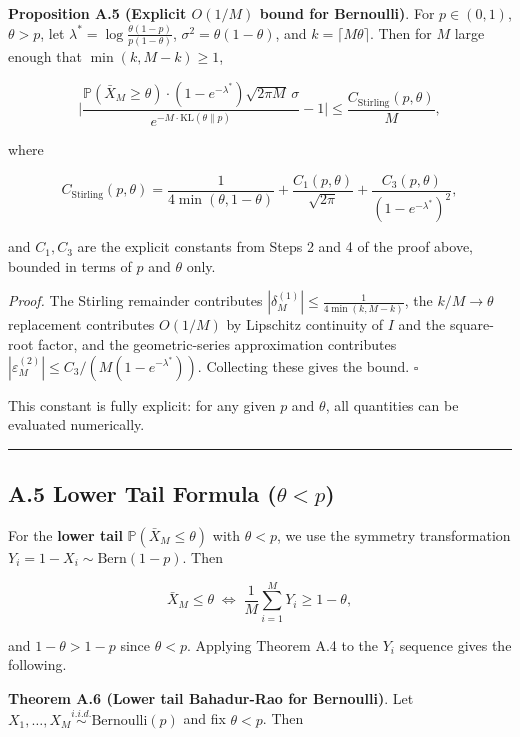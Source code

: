 \documentclass[
  12pt,
]{article}
\begin{document}
\textbf{Proposition A.5 (Explicit \(O(1/M)\) bound for Bernoulli)}. For
\(p \in (0,1)\), \(\theta > p\), let
\(\lambda^* = \log\frac{\theta(1-p)}{p(1-\theta)}\),
\(\sigma^2 = \theta(1-\theta)\), and \(k = \lceil M\theta\rceil\). Then
for \(M\) large enough that \(\min(k, M-k) \geq 1\),

\[
\Bigg|
\frac{\mathbb{P}(\bar{X}_M \geq \theta) \cdot (1-e^{-\lambda^*}) \sqrt{2\pi M}\, \sigma}
{e^{-M\cdot\text{KL}(\theta\|p)}} - 1
\Bigg| \leq \frac{C_{\text{Stirling}}(p,\theta)}{M},
\]

where

\[C_{\text{Stirling}}(p,\theta) = \frac{1}{4\min(\theta, 1-\theta)}
+ \frac{C_1(p,\theta)}{\sqrt{2\pi}} + \frac{C_3(p,\theta)}{(1-e^{-\lambda^*})^2},\]

and \(C_1, C_3\) are the explicit constants from Steps 2 and 4 of the
proof above, bounded in terms of \(p\) and \(\theta\) only.

\emph{Proof.} The Stirling remainder contributes
\(|\delta_M^{(1)}| \leq \frac{1}{4\min(k,M-k)}\), the \(k/M \to \theta\)
replacement contributes \(O(1/M)\) by Lipschitz continuity of \(I\) and
the square-root factor, and the geometric-series approximation
contributes \(|\varepsilon_M^{(2)}|
\leq C_3/(M(1-e^{-\lambda^*}))\). Collecting these gives the bound.
\(\square\)

This constant is fully explicit: for any given \(p\) and \(\theta\), all
quantities can be evaluated numerically.

\begin{center}\rule{0.5\linewidth}{0.5pt}\end{center}

\subsection{\texorpdfstring{A.5 Lower Tail Formula
(\(\theta < p\))}{A.5 Lower Tail Formula (\textbackslash theta \textless{} p)}}\label{a.5-lower-tail-formula-theta-p}

For the \textbf{lower tail} \(\mathbb{P}(\bar{X}_M \leq \theta)\) with
\(\theta < p\), we use the symmetry transformation
\(Y_i = 1 - X_i \sim \text{Bern}(1-p)\). Then

\[\bar{X}_M \leq \theta \;\Longleftrightarrow\; \frac{1}{M}\sum_{i=1}^M Y_i \geq 1-\theta,\]

and \(1-\theta > 1-p\) since \(\theta < p\). Applying Theorem A.4 to the
\(Y_i\) sequence gives the following.

\textbf{Theorem A.6 (Lower tail Bahadur-Rao for Bernoulli)}. Let
\(X_1,\ldots,X_M \stackrel{i.i.d.}{\sim} \text{Bernoulli}(p)\) and fix
\(\theta < p\). Then
\end{document}
